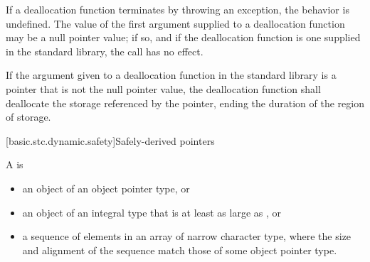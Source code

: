 \pnum
If a deallocation function terminates by throwing an exception, the behavior is undefined.
The value of the first argument supplied to a deallocation function may
be a null pointer value; if so, and if the deallocation function is one
supplied in the standard library, the call has no effect.

\pnum
If the argument given to a deallocation function in the standard library
is a pointer that is not the null pointer value, the
deallocation function shall deallocate the storage referenced by the
pointer, ending the duration of the region of storage.

[basic.stc.dynamic.safety]{Safely-derived pointers}

\pnum
{}%
%
A  is
\begin{itemize}
\item an object of an object pointer
type, or
\item an object of an integral type that is at least as large as ,
or
\item a sequence of elements in an array of narrow character
type, where the size and alignment of the sequence
match those of some object pointer type.
\end{itemize}

